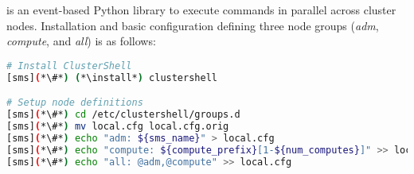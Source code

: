 \clustershell{} is an event-based Python library to execute commands in parallel
across cluster nodes. Installation and basic configuration defining three node
groups ({\em adm}, {\em compute}, and {\em all}) is as follows:

\begin{lstlisting}[language=bash,keywords={},upquote=true]
# Install ClusterShell
[sms](*\#*) (*\install*) clustershell

# Setup node definitions
[sms](*\#*) cd /etc/clustershell/groups.d
[sms](*\#*) mv local.cfg local.cfg.orig
[sms](*\#*) echo "adm: ${sms_name}" > local.cfg
[sms](*\#*) echo "compute: ${compute_prefix}[1-${num_computes}]" >> local.cfg
[sms](*\#*) echo "all: @adm,@compute" >> local.cfg
\end{lstlisting}

